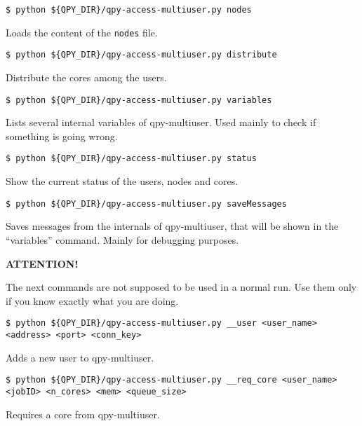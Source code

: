 \documentclass[a4paper,12pt]{article}
\begin{document}
\begin{lstlisting}[style=BashStyle]
$ python ${QPY_DIR}/qpy-access-multiuser.py nodes
\end{lstlisting}

Loads the content of the \texttt{nodes} file.

\begin{lstlisting}[style=BashStyle]
$ python ${QPY_DIR}/qpy-access-multiuser.py distribute
\end{lstlisting}

Distribute the cores among the users.

\begin{lstlisting}[style=BashStyle]
$ python ${QPY_DIR}/qpy-access-multiuser.py variables
\end{lstlisting}

Lists several internal variables of qpy-multiuser.
Used mainly to check if something is going wrong.

\begin{lstlisting}[style=BashStyle]
$ python ${QPY_DIR}/qpy-access-multiuser.py status
\end{lstlisting}

Show the current status of the users, nodes and cores.

\begin{lstlisting}[style=BashStyle]
$ python ${QPY_DIR}/qpy-access-multiuser.py saveMessages
\end{lstlisting}

Saves messages from the internals of qpy-multiuser, that will be shown in the ``variables'' command.
Mainly for debugging purposes.

\textbf{ATTENTION!}

The next commands are not supposed to be used in a normal run.
Use them only if you know exactly what you are doing.

\begin{lstlisting}[style=BashStyle]
$ python ${QPY_DIR}/qpy-access-multiuser.py __user <user_name> <address> <port> <conn_key>
\end{lstlisting}

Adds a new user to qpy-multiuser.

\begin{lstlisting}[style=BashStyle]
$ python ${QPY_DIR}/qpy-access-multiuser.py __req_core <user_name> <jobID> <n_cores> <mem> <queue_size>
\end{lstlisting}

Requires a core from qpy-multiuser.
\end{document}

